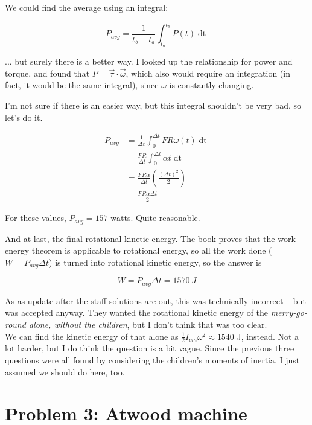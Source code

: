 \documentclass[8.01x]{subfiles}
\begin{document}
We could find the average using an integral: 

\begin{equation}
P_{avg} = \frac{1}{t_b - t_a} \int_{t_a}^{t_b} P(t) \mathop{dt}
\end{equation}

... but surely there is a better way. I looked up the relationship for power and torque, and found that $P = \vec{\tau} \cdot \vec{\omega}$, which also would require an integration (in fact, it would be the same integral), since $\omega$ is constantly changing.

I'm not sure if there is an easier way, but this integral shouldn't be very bad, so let's do it.

\begin{align}
P_{avg} &= \frac{1}{\Delta t} \int_{0}^{\Delta t} F R \omega(t) \mathop{dt}\\
        &= \frac{F R}{\Delta t} \int_{0}^{\Delta t} \alpha t \mathop{dt}\\
        &= \frac{F R \alpha}{\Delta t} \left(\frac{(\Delta t)^2}{2}\right)\\
        &= \frac{F R \alpha \Delta t}{2}
\end{align}

For these values, $P_{avg} = 157$ watts. Quite reasonable.

And at last, the final rotational kinetic energy. The book proves that the work-energy theorem is applicable to rotational energy, so all the work done ($W = P_{avg} \Delta t$) is turned into rotational kinetic energy, so the answer is 

\begin{equation}
W = P_{avg} \Delta t = \SI{1570}{J}
\end{equation}

As as update after the staff solutions are out, this was technically incorrect -- but was accepted anyway. They wanted the rotational kinetic energy of the \emph{merry-go-round alone, without the children}, but I don't think that was too clear.\\
We can find the kinetic energy of that alone as $\displaystyle \frac{1}{2} I_{cm} \omega^2 \approx 1540$ J, instead. Not a lot harder, but I do think the question is a bit vague. Since the previous three questions were all found by considering the children's moments of inertia, I just assumed we should do here, too.

\section{Problem 3: Atwood machine}
\end{document}
